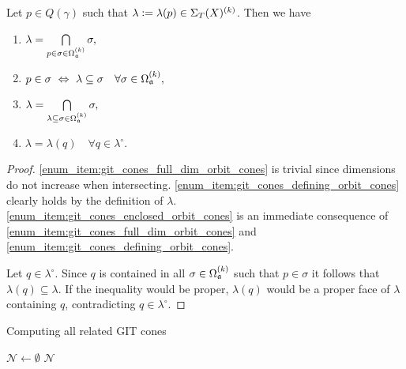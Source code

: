 \begin{lemma}
	\label{lemma:git_cones_elementary_properties}
	Let $p\in Q(\gamma)$ such that $\lambda \mathrel{\mathop:}= \lambda(p)\in\Sigma_T(X)^{(k)}$. Then we have
	\begin{enumerate}[label={\upshape(\roman*)}]
		\item $\lambda = \bigcap\limits_{p\in\sigma\in\Omega_{\mathfrak{a}}^{(k)}}\sigma,$
			\label{enum_item:git_cones_full_dim_orbit_cones}
		\item $p\in\sigma\ \Leftrightarrow\ \lambda\subseteq\sigma\quad\forall\sigma\in\Omega_\ideal^{(k)},$
			\label{enum_item:git_cones_defining_orbit_cones}
		\item $\lambda = \bigcap\limits_{\lambda\subseteq\sigma\in\Omega_{\mathfrak{a}}^{(k)}}\sigma,$
			\label{enum_item:git_cones_enclosed_orbit_cones}
		\item $\lambda = \lambda(q)\quad \forall q\in\lambda^\circ.$
			\label{enum_item:git_cones_relative_interior}
	\end{enumerate}
\end{lemma}
\begin{proof}
	\ref{enum_item:git_cones_full_dim_orbit_cones} is trivial since dimensions do not increase when intersecting. \ref{enum_item:git_cones_defining_orbit_cones} clearly holds by the definition of $\lambda$. \ref{enum_item:git_cones_enclosed_orbit_cones} is an immediate consequence of \ref{enum_item:git_cones_full_dim_orbit_cones} and \ref{enum_item:git_cones_defining_orbit_cones}.
	
	Let $q\in\lambda^\circ$. Since $q$ is contained in all $\sigma\in\Omega_{\mathfrak{a}}^{(k)}$ such that $p\in\sigma$ it follows that $\lambda(q)\subseteq\lambda$. If the inequality would be proper, $\lambda(q)$ would be a proper face of $\lambda$ containing $q$, contradicting $q\in\lambda^\circ$.
\end{proof}

\begin{algorithm}
	\caption{Computing all related GIT cones}
	\label{algo:compute_git_cone_neighbours}
	
	\BlankLine
	$\mathcal{N} \leftarrow \emptyset$\;
	\Return $\mathcal{N}$\;
\end{algorithm}

